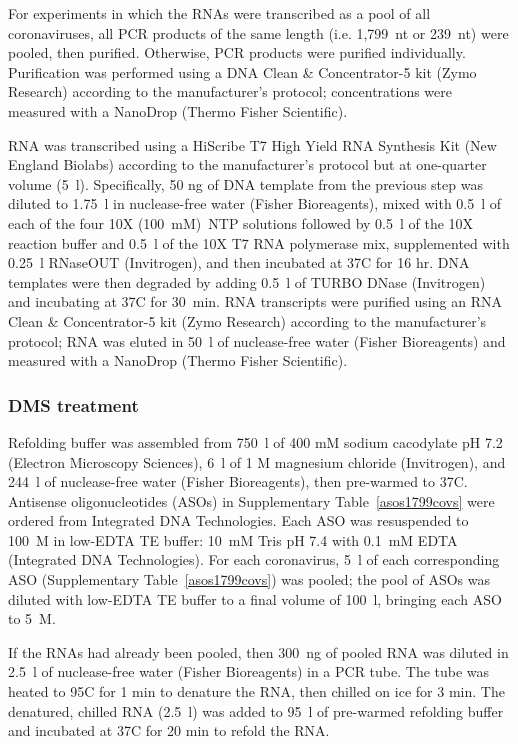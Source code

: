 \documentclass[main.tex]{subfiles}
\begin{document}
For experiments in which the RNAs were transcribed as a pool of all coronaviruses, all PCR products of the same length (i.e. 1,799~nt or 239~nt) were pooled, then purified.
Otherwise, PCR products were purified individually.
Purification was performed using a DNA Clean \& Concentrator-5 kit (Zymo Research) according to the manufacturer's protocol; concentrations were measured with a NanoDrop (Thermo Fisher Scientific).

RNA was transcribed using a HiScribe T7 High Yield RNA Synthesis Kit (New England Biolabs) according to the manufacturer's protocol but at one-quarter volume (5~\textmu l).
Specifically, 50 ng of DNA template from the previous step was diluted to 1.75~\textmu l in nuclease-free water (Fisher Bioreagents), mixed with 0.5~\textmu l of each of the four 10X (100~mM)~NTP solutions followed by 0.5~\textmu l of the 10X reaction buffer and 0.5~\textmu l of the 10X T7 RNA polymerase mix, supplemented with 0.25~\textmu l RNaseOUT (Invitrogen), and then incubated at 37\textdegree C for 16 hr.
DNA templates were then degraded by adding 0.5~\textmu l of TURBO DNase (Invitrogen) and incubating at 37\textdegree C for 30~min.
RNA transcripts were purified using an RNA Clean \& Concentrator-5 kit (Zymo Research) according to the manufacturer's protocol; RNA was eluted in 50~\textmu l of nuclease-free water (Fisher Bioreagents) and measured with a NanoDrop (Thermo Fisher Scientific).

\subsubsection{DMS treatment}

Refolding buffer was assembled from 750~\textmu l of 400 mM sodium cacodylate pH 7.2 (Electron Microscopy Sciences), 6~\textmu l of 1 M magnesium chloride (Invitrogen), and 244~\textmu l of nuclease-free water (Fisher Bioreagents), then pre-warmed to 37\textdegree C.
Antisense oligonucleotides (ASOs) in Supplementary Table~\ref{asos1799covs} were ordered from Integrated DNA Technologies.
Each ASO was resuspended to 100~\textmu M in low-EDTA TE buffer: 10~mM Tris pH 7.4 with 0.1~mM EDTA (Integrated DNA Technologies).
For each coronavirus, 5~\textmu l of each corresponding ASO (Supplementary Table~\ref{asos1799covs}) was pooled; the pool of ASOs was diluted with low-EDTA TE buffer to a final volume of 100~\textmu l, bringing each ASO to 5~\textmu M.

If the RNAs had already been pooled, then 300~ng of pooled RNA was diluted in 2.5~\textmu l of nuclease-free water (Fisher Bioreagents) in a PCR tube.
The tube was heated to 95\textdegree C for 1 min to denature the RNA, then chilled on ice for 3 min.
The denatured, chilled RNA (2.5~\textmu l) was added to 95~\textmu l of pre-warmed refolding buffer and incubated at 37\textdegree C for 20 min to refold the RNA.
\end{document}
